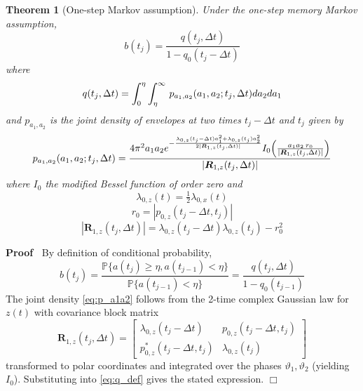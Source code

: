 \documentclass{article}
\newcommand{\tmmathbf}[1]{\ensuremath{\boldsymbol{#1}}}
\newenvironment{proof}{\noindent\textbf{Proof\ }}{\hspace*{\fill}$\Box$\medskip}
\newtheorem{theorem}{Theorem}
\begin{document}
\begin{theorem}
  [One-step Markov assumption]\label{thm:markov} Under the one-step memory
  Markov assumption,
  \begin{equation}
    b (t_j) = \frac{q (t_j, \Delta t)}{1 - q_0  (t_j - \Delta t)}
  \end{equation}
  where
  \begin{equation}
    \label{eq:q_def} q (t_j, \Delta t) = \int_0^{\eta}  \int_{\eta}^{\infty}
    \hspace{0.17em} p_{a_1, a_2} (a_1, a_2 ; t_j, \Delta t) da_2 da_1
  \end{equation}
  and $p_{a_1, a_2}$ is the joint density of envelopes at two times $t_j -
  \Delta t$ and $t_j$ given by
  \begin{equation}
    \label{eq:p_a1a2} p_{a_1, a_2} (a_1, a_2 ; t_j, \Delta t) = \frac{4 \pi^2
    a_1 a_2 e^{- \frac{\lambda_{0, z}  (t_j - \Delta t) a_1^2 + \lambda_{0, z}
    (t_j) a_2^2}{2 |\tmmathbf{R}_{1, z} (t_j, \Delta t) |}} I_0
    \hspace{-0.17em} \left( \frac{a_1 a_2  \hspace{0.17em}
    r_0}{|\tmmathbf{R}_{1, z} (t_j, \Delta t) |} \right)}{|\tmmathbf{R}_{1, z}
    (t_j, \Delta t) |}
  \end{equation}
  where $I_0$ the modified Bessel function of order zero and
  \begin{equation}
    \lambda_{0, z} (t) = \tfrac{1}{2} \lambda_{0, x} (t)
  \end{equation}
  \begin{equation}
    r_0 = |p_{0, z} (t_j - \Delta t, t_j) |
  \end{equation}
  \begin{equation}
    |\tmmathbf{R}_{1, z} (t_j, \Delta t) | = \lambda_{0, z}  (t_j - \Delta t)
    \lambda_{0, z} (t_j) - r_0^2
  \end{equation}
\end{theorem}

\begin{proof}
  By definition of conditional probability,
  \begin{equation}
    b (t_j) = \frac{\mathbb{P} \{a (t_j) \ge \eta, a (t_{j - 1}) <
    \eta\}}{\mathbb{P} \{a (t_{j - 1}) < \eta\}} = \frac{q (t_j, \Delta t)}{1
    - q_0 (t_{j - 1})}
  \end{equation}
  The joint density \eqref{eq:p_a1a2} follows from the 2-time complex Gaussian
  law for $z (t)$ with covariance block matrix
  \begin{equation}
    \tmmathbf{R}_{1, z} (t_j, \Delta t) = \left[ \begin{array}{cc}
      \lambda_{0, z} (t_j - \Delta t) & p_{0, z} (t_j - \Delta t, t_j)\\
      p_{0, z}^{\ast} (t_j - \Delta t, t_j) & \lambda_{0, z} (t_j)
    \end{array} \right]
  \end{equation}
  transformed to polar coordinates and integrated over the phases
  $\vartheta_1, \vartheta_2$ (yielding $I_0$). Substituting into
  \eqref{eq:q_def} gives the stated expression.
\end{proof}
\end{document}
